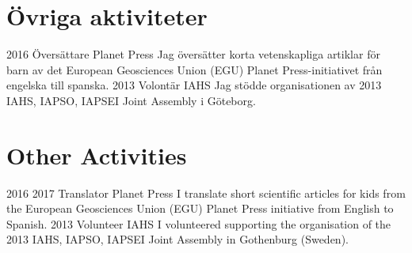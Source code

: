 \ifswedish
  \section{Övriga aktiviteter}
      \position
          {2016 \textemdash{}}
          {Översättare}
          {Planet Press}
          {Jag översätter korta vetenskapliga artiklar för barn av det European Geosciences Union (EGU) Planet Press-initiativet från engelska till spanska.}
      \position
          {2013}
          {Volontär}
          {IAHS}
          {Jag stödde organisationen av 2013 IAHS, IAPSO, IAPSEI Joint Assembly i Göteborg.}
\else
  \section{Other Activities}
      \position
          {2016 \textemdash{} 2017}
          {Translator}
          {Planet Press}
          {I translate short scientific articles for kids from the European Geosciences Union (EGU) Planet Press initiative from English to Spanish.}
      \position
          {2013}
          {Volunteer}
          {IAHS}
          {I volunteered supporting the organisation of the 2013 IAHS, IAPSO, IAPSEI Joint Assembly in Gothenburg (Sweden).}
\fi
